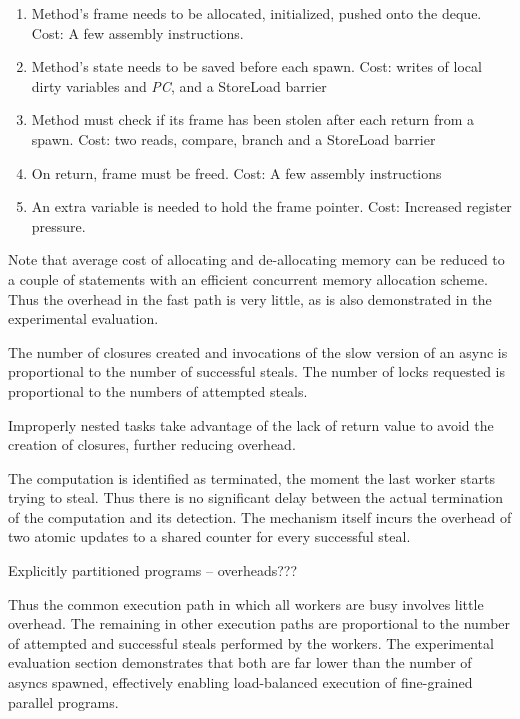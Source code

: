 \begin{enumerate}
\item Method's frame needs to be allocated, initialized, pushed onto
  the deque. Cost: A few assembly instructions.
\item Method's state needs to be saved before each spawn. Cost: writes of
  local dirty variables and {\em PC}, and a StoreLoad barrier
\item Method must check if its frame has been stolen after each
  return from a spawn. Cost: two reads, compare, branch and a 
  StoreLoad barrier 
\item On return, frame must be freed. Cost: A few assembly instructions
\item An extra variable is needed to hold the frame pointer. Cost: Increased
  register pressure.
\end{enumerate}

Note that average cost of allocating and de-allocating memory can be
reduced to a couple of statements with an efficient concurrent memory
allocation scheme. Thus the overhead in the fast path is very
little, as is also demonstrated in the experimental evaluation.

The number of closures created and invocations of the slow version of
an async is proportional to the number of successful steals. The
number of locks requested is proportional to the numbers of attempted
steals. 

Improperly nested tasks take advantage of the lack of return value to
avoid the creation of closures, further reducing overhead. 

The computation is identified as terminated, the moment the last
worker starts trying to steal. Thus there is no significant delay
between the actual termination of the computation and its detection.
The mechanism itself incurs the overhead of two atomic updates to a
shared counter for every successful steal. 

Explicitly partitioned programs -- overheads???

Thus the common execution path in which all workers are busy involves
little overhead. The remaining in other execution paths are
proportional to the number of attempted and successful steals
performed by the workers. The experimental evaluation section
demonstrates that both are far lower than the number of asyncs
spawned, effectively enabling load-balanced execution of fine-grained
parallel programs.

